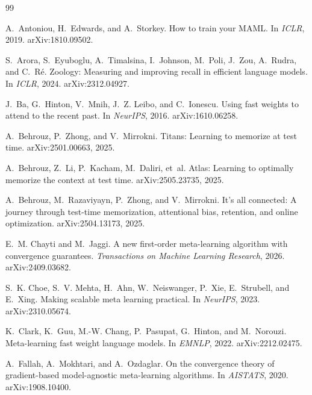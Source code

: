 \documentclass[11pt]{article}
\begin{document}
\begin{thebibliography}{99}

A.~Antoniou, H.~Edwards, and A.~Storkey.
\newblock How to train your {MAML}.
\newblock In \emph{ICLR}, 2019. arXiv:1810.09502.

S.~Arora, S.~Eyuboglu, A.~Timalsina, I.~Johnson, M.~Poli, J.~Zou, A.~Rudra, and C.~R{\'e}.
\newblock Zoology: Measuring and improving recall in efficient language models.
\newblock In \emph{ICLR}, 2024. arXiv:2312.04927.

J.~Ba, G.~Hinton, V.~Mnih, J.~Z. Leibo, and C.~Ionescu.
\newblock Using fast weights to attend to the recent past.
\newblock In \emph{NeurIPS}, 2016. arXiv:1610.06258.

A.~Behrouz, P.~Zhong, and V.~Mirrokni.
\newblock Titans: Learning to memorize at test time.
\newblock arXiv:2501.00663, 2025.

A.~Behrouz, Z.~Li, P.~Kacham, M.~Daliri, et~al.
\newblock Atlas: Learning to optimally memorize the context at test time.
\newblock arXiv:2505.23735, 2025.

A.~Behrouz, M.~Razaviyayn, P.~Zhong, and V.~Mirrokni.
\newblock It's all connected: A journey through test-time memorization, attentional bias, retention,
  and online optimization.
\newblock arXiv:2504.13173, 2025.

E.~M. Chayti and M.~Jaggi.
\newblock A new first-order meta-learning algorithm with convergence guarantees.
\newblock \emph{Transactions on Machine Learning Research}, 2026. arXiv:2409.03682.

S.~K. Choe, S.~V. Mehta, H.~Ahn, W.~Neiswanger, P.~Xie, E.~Strubell, and E.~Xing.
\newblock Making scalable meta learning practical.
\newblock In \emph{NeurIPS}, 2023. arXiv:2310.05674.

K.~Clark, K.~Guu, M.-W. Chang, P.~Pasupat, G.~Hinton, and M.~Norouzi.
\newblock Meta-learning fast weight language models.
\newblock In \emph{EMNLP}, 2022. arXiv:2212.02475.

A.~Fallah, A.~Mokhtari, and A.~Ozdaglar.
\newblock On the convergence theory of gradient-based model-agnostic meta-learning algorithms.
\newblock In \emph{AISTATS}, 2020. arXiv:1908.10400.


\end{thebibliography}
\end{document}
